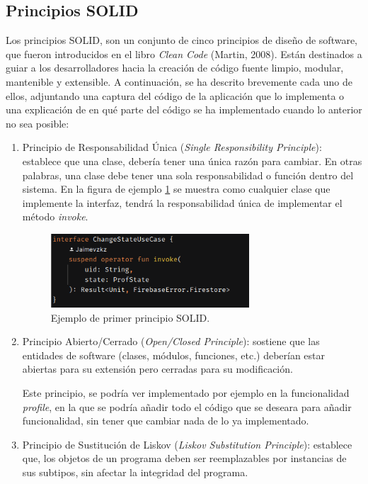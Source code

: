 \subsection{Principios SOLID}
\label{subsec:solid}
Los principios SOLID, son un conjunto de cinco principios de diseño de software, que fueron introducidos en el libro \textit{Clean Code} (Martin, 2008)\hyperlink{cap:biblio}{}. Están destinados a guiar a los desarrolladores hacia la creación de código fuente limpio, modular, mantenible y extensible. A continuación, se ha descrito brevemente cada uno de ellos, adjuntando una captura del código de la aplicación que lo implementa o una explicación de en qué parte del código se ha implementado cuando lo anterior no sea posible:
\begin{enumerate}
    \item Principio de Responsabilidad Única (\textit{Single Responsibility Principle}): establece que una clase, debería tener una única razón para cambiar. En otras palabras, una clase debe tener una sola responsabilidad o función dentro del sistema. En la figura de ejemplo \ref{fig:change_state} se muestra como cualquier clase que implemente la interfaz, tendrá la responsabilidad única de implementar el método \textit{invoke}.
    \begin{figure}[h]
        \centering
        \includegraphics[width = 0.7\textwidth]{Imagenes/Fuentes/change_state.png}
        \caption{Ejemplo de primer principio SOLID.}
        \label{fig:change_state}
    \end{figure}
    \item Principio Abierto/Cerrado (\textit{Open/Closed Principle}): sostiene que las entidades de software (clases, módulos, funciones, etc.) deberían estar abiertas para su extensión pero cerradas para su modificación.
    
    Este principio, se podría ver implementado por ejemplo en la funcionalidad \textit{profile}, en la que se podría añadir todo el código que se deseara para añadir funcionalidad, sin tener que cambiar nada de lo ya implementado.
    \item Principio de Sustitución de Liskov (\textit{Liskov Substitution Principle}): establece que, los objetos de un programa deben ser reemplazables por instancias de sus subtipos, sin afectar la integridad del programa.
    

\end{enumerate}

